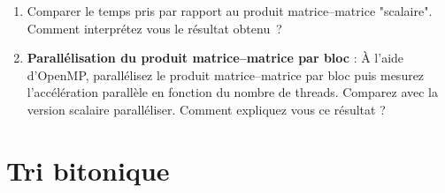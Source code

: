 \documentclass[11pt,a4paper]{article}
\begin{document}
\begin{enumerate}
	L'idée est de décomposer les matrices $A,B$ et $C$ en sous-blocs matriciels :
	\[
	A = \left(
	\begin{array}{cccc}
	A_{11} & A_{12} & \ldots & A_{1N} \\
	A_{21} & \ddots &        & \vdots \\
	\vdots &        & \ddots & \vdots \\
	A_{N1} &        &        & A_{NN}
	\end{array}
	\right),
	B = \left(
	\begin{array}{cccc}
	B_{11} & B_{12} & \ldots & B_{1N} \\
	B_{21} & \ddots &        & \vdots \\
	\vdots &        & \ddots & \vdots \\
	B_{N1} &        &        & B_{NN}
	\end{array}
	\right),
	C = \left(
	\begin{array}{cccc}
	C_{11} & C_{12} & \ldots & C_{1N} \\
	C_{21} & \ddots &        & \vdots \\
	\vdots &        & \ddots & \vdots \\
	C_{N1} &        &        & C_{NN}
	\end{array}
	\right)
	\]

où $A_{IJ},B_{IJ}$ et $C_{IJ}$ sont des sous--blocs possédant une taille fixée ( par le programmeur ).

Le produit matrice--matrice se fait alors par bloc. Pour calculer le bloc $C_{IJ}$, on calcul
\[
C_{IJ} = \sum_{K=1}^{N}A_{IK}.B_{KJ}
\]

Mettre en {\oe}uvre ce produit matrice--matrice en séquentiel puis faire varier la taille des blocs jusqu'à obtenir un optimum.
\item Comparer le temps pris par rapport au produit matrice--matrice "scalaire". Comment interprétez vous le résultat obtenu~?

\item \textbf{\color{blue}Parallélisation du produit matrice--matrice par bloc }: \`A l'aide d'OpenMP, parallélisez le produit matrice--matrice par bloc puis mesurez l'accélération parallèle en fonction du nombre de threads. Comparez avec la version scalaire paralléliser. Comment expliquez vous ce résultat ?
\end{enumerate}

\section{Tri bitonique}
\end{document}
